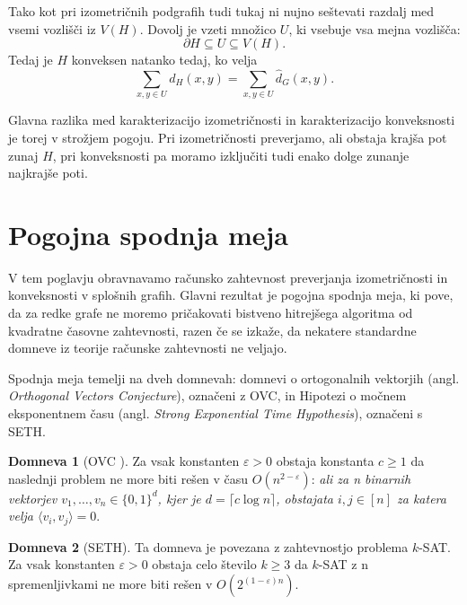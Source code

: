 \documentclass[sigconf
]{acmart}
\theoremstyle{definition}
\newtheorem{assumption}{Domneva}[section]
\begin{document}
Tako kot pri izometričnih podgrafih tudi tukaj ni nujno seštevati razdalj med vsemi vozlišči iz $V(H)$. Dovolj je vzeti množico $U$, ki vsebuje vsa mejna vozlišča:
\begin{equation}
    \partial H \subseteq U \subseteq V(H).
\end{equation}
Tedaj je $H$ konveksen natanko tedaj, ko velja
\begin{equation}
    \sum_{x,y \in U} d_H(x,y)
    =
    \sum_{x,y \in U} \hat{d}_G(x,y).
\end{equation}

Glavna razlika med karakterizacijo izometričnosti in karakterizacijo konveksnosti je torej v strožjem pogoju. Pri izometričnosti preverjamo, ali obstaja krajša pot zunaj $H$, pri konveksnosti pa moramo izključiti tudi enako dolge zunanje najkrajše poti. 

\section{Pogojna spodnja meja}

V tem poglavju obravnavamo računsko zahtevnost preverjanja izometričnosti in konveksnosti v splošnih grafih. Glavni rezultat je pogojna spodnja meja, ki pove, da za redke grafe ne moremo pričakovati bistveno hitrejšega algoritma od kvadratne časovne zahtevnosti, razen če se izkaže, da nekatere standardne domneve iz teorije računske zahtevnosti ne veljajo.

Spodnja meja temelji na dveh domnevah: domnevi o ortogonalnih vektorjih (angl. \textit{Orthogonal Vectors Conjecture}), označeni z OVC, in Hipotezi o močnem eksponentnem času (angl. \textit{Strong Exponential Time Hypothesis}), označeni s SETH.


\begin{assumption}[OVC \cite{WILLIAMS2005357}] Za vsak konstanten $\varepsilon > 0$ obstaja konstanta $c \geq 1$ da naslednji problem ne more biti rešen v času $O(n^{2-\varepsilon})$: \textit{ ali za n binarnih vektorjev $v_1, \ldots, v_n \in \{0,1\}^d$, kjer je $d = \lceil c \log n \rceil$, obstajata $i,j \in [n]$ za katera velja $\langle v_i, v_j \rangle = 0$}.

\end{assumption}
\begin{assumption}[SETH] 
  Ta domneva je povezana z zahtevnostjo problema $k$-SAT. Za vsak konstanten $\varepsilon > 0$ obstaja celo število $k \geq 3$ da $k$-SAT z n spremenljivkami ne more biti rešen v $O(2^{(1-\varepsilon)n})$.
\end{assumption}
\end{document}
